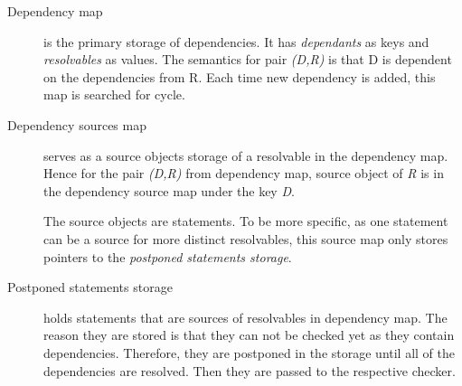 \begin{description}
	\item[Dependency map] is the primary storage of dependencies. It has \emph{dependants} as keys and \emph{resolvables} as values. The semantics for pair \emph{(D,R)} is that D is dependent on the dependencies from R. Each time new dependency is added, this map is searched for cycle.
	
	\item[Dependency sources map] serves as a source objects storage of a resolvable in the dependency map. Hence for the pair \emph{(D,R)} from dependency map, source object of \emph{R} is in the dependency source map under the key \emph{D}. 
	
	The source objects are statements. To be more specific, as one statement can be a source for more distinct resolvables, this source map only stores pointers to the \emph{postponed statements storage}.
	
	\item[Postponed statements storage] holds statements that are sources of resolvables in dependency map. The reason they are stored is that they can not be checked yet as they contain dependencies. Therefore, they are postponed in the storage until all of the dependencies are resolved. Then they are passed to the respective checker.
\end{description}


